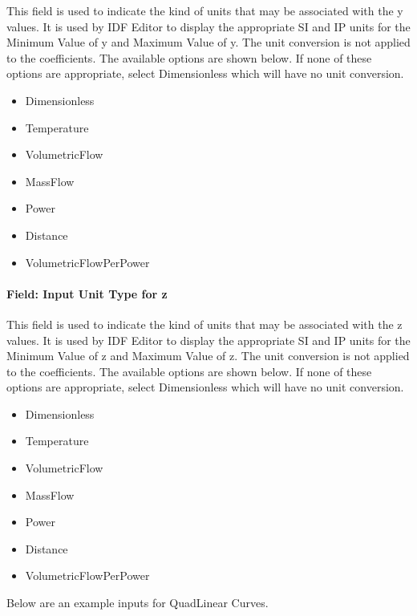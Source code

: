 This field is used to indicate the kind of units that may be associated with the y values. It is used by IDF Editor to display the appropriate SI and IP units for the Minimum Value of y and Maximum Value of y. The unit conversion is not applied to the coefficients. The available options are shown below. If none of these options are appropriate, select Dimensionless which will have no unit conversion.

\begin{itemize}
\item
  Dimensionless
\item
  Temperature
\item
  VolumetricFlow
\item
  MassFlow
\item
  Power
\item
  Distance
\item
  VolumetricFlowPerPower
\end{itemize}

\paragraph{Field: Input Unit Type for z}\label{field-input-unit-type-for-z}

This field is used to indicate the kind of units that may be associated with the z values. It is used by IDF Editor to display the appropriate SI and IP units for the Minimum Value of z and Maximum Value of z. The unit conversion is not applied to the coefficients. The available options are shown below. If none of these options are appropriate, select Dimensionless which will have no unit conversion.

\begin{itemize}
\item
  Dimensionless
\item
  Temperature
\item
  VolumetricFlow
\item
  MassFlow
\item
  Power
\item
  Distance
\item
  VolumetricFlowPerPower
\end{itemize}

Below are an example inputs for QuadLinear Curves.

